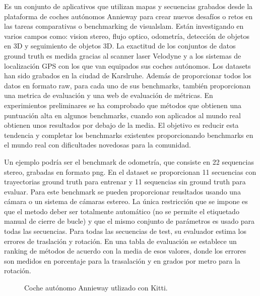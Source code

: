 \begin {enumerate}
Es un conjunto de aplicativos que utilizan mapas y secuencias grabados desde la plataforma de coches autónomos Annieway para crear nuevos desafíos o retos en las tareas comparativas o benchmarking de visualslam.\cite{Geiger2012CVPR}
Están investigando en varios campos como: vision stereo, flujo optico, odometría, detección de objetos en 3D y seguimiento de objetos 3D.
La exactitud de los conjuntos de datos ground truth es medida gracias al scanner laser Velodyne y a los sistemas de localización GPS con los que van equipados sus coches autónomos.
Los datasets han sido grabados en la ciudad de Karslruhe.
Además de proporcionar todos los datos en formato raw, para cada uno de sus benchmarks, también proporcionan una metrica de evaluación y una web de evaluación de métricas. En experimientos preliminares se ha comprobado que métodos que obtienen una puntuación alta en algunos benchmarks, cuando son aplicados al mundo real obtienen unos resultados por debajo de la media. El objetivo es reducir esta tendencia y completar los benchmarks existentes proporcionando benchmarks en el mundo real con dificultades novedosas para la comunidad. 

Un ejemplo podría ser el benchmark de odometría, que consiste en 22 sequencias stereo, grabadas en formato png. En el dataset se proporcionan 11 secuencias con trayectorias ground truth para entrenar y 11 sequencias sin ground truth para evaluar. Para este benchmark se pueden proporcionar reusltados usando una cámara o un sistema de cámaras estereo.
La única restricción que se impone es que el metodo deber ser totalmente automático (no se permite el etiquetado manual de cierre de bucle) y que el mismo conjunto de parámetros es usado para todas las secuencias.
Para todas las secuencias de test, su evaluador estima los errores de traslación y rotación. En una tabla de evaluación se establece un ranking de métodos de acuerdo con la media de esos valores, donde los errores son medidos en porcentaje para la trasalación y en grados por metro para la rotación.
\begin{figure}[H]
\begin{center}
\end{center}
\caption{Coche autónomo Annieway utlizado con Kitti.}
\end{figure}

\end {enumerate}


